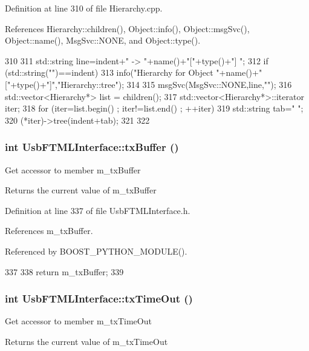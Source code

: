 Definition at line 310 of file Hierarchy.cpp.

References Hierarchy::children(), Object::info(), Object::msgSvc(), Object::name(), MsgSvc::NONE, and Object::type().


\begin{DoxyCode}
310                                     {
311   std::string line=indent+" -> "+name()+"["+type()+"] ";
312   if (std::string("")==indent){
313     info("Hierarchy for Object "+name()+"["+type()+"]","Hierarchy::tree");
314   }
315   msgSvc(MsgSvc::NONE,line,"");
316   std::vector<Hierarchy*> list = children();
317   std::vector<Hierarchy*>::iterator iter;
318   for (iter=list.begin() ; iter!=list.end() ; ++iter){
319     std::string tab="  ";
320     (*iter)->tree(indent+tab);
321   }
322 }
\end{DoxyCode}
\hypertarget{classUsbFTMLInterface_ada338c9311fdb6d788a951f41cf9101f}{
\subsubsection[{txBuffer}]{\setlength{\rightskip}{0pt plus 5cm}int UsbFTMLInterface::txBuffer ()}}
\label{classUsbFTMLInterface_ada338c9311fdb6d788a951f41cf9101f}
Get accessor to member m\_\-txBuffer \begin{DoxyReturn}{Returns}
the current value of m\_\-txBuffer 
\end{DoxyReturn}


Definition at line 337 of file UsbFTMLInterface.h.

References m\_\-txBuffer.

Referenced by BOOST\_\-PYTHON\_\-MODULE().


\begin{DoxyCode}
337                   {
338     return m_txBuffer;
339   }
\end{DoxyCode}
\hypertarget{classUsbFTMLInterface_ad7e76fd952273faf094bf3475b2963da}{
\subsubsection[{txTimeOut}]{\setlength{\rightskip}{0pt plus 5cm}int UsbFTMLInterface::txTimeOut ()}}
\label{classUsbFTMLInterface_ad7e76fd952273faf094bf3475b2963da}
Get accessor to member m\_\-txTimeOut \begin{DoxyReturn}{Returns}
the current value of m\_\-txTimeOut 
\end{DoxyReturn}


